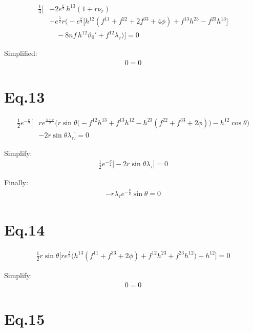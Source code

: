 \documentclass[12pt]{article}
\begin{document}
\begin{align*}
\frac{1}{4} \Big[
 & -2 e^{\frac{\nu}{2}} \, h^{13} \left( 1 + r \nu_r \right) \\
 & + e^{\frac{\lambda}{2}} r \Big(
   - e^{\frac{\nu}{2}} \big[
       h^{12}(f^{11} + f^{22} + 2f^{33} + 4\phi)
       + f^{13} h^{23}
       - f^{23} h^{13}
     \big] \\
   & \quad - 8 nf \, h^{12} \vartheta_0'
   + f^{12}\lambda_\tau
 \Big)
\Big] = 0
\end{align*}

Simplified:
\begin{align*}
  0 = 0
\end{align*}

\section*{Eq.13}

\begin{align*}
\frac{1}{2} e^{-\frac{\nu}{2}} \Big[
  & r e^{\frac{\lambda + \nu}{2}} 
  \Big(
    r \sin\theta \big(
      -f^{12}h^{13}
      + f^{13}h^{12}
      - h^{23}(f^{22} + f^{33} + 2\phi)
    \big)
    - h^{12}\cos\theta
  \Big) \\
  & - 2r \sin\theta \lambda_\tau
\Big] = 0
\end{align*}

Simplify:
\begin{align*}
\frac{1}{2} e^{-\frac{\nu}{2}} \Big[ - 2r \sin\theta \lambda_\tau \Big] = 0
\end{align*}

Finally:
\begin{align*}
- r \lambda_\tau e^{-\frac{\nu}{2}}\sin\theta = 0
\end{align*}

\section*{Eq.14}

\begin{align*}
\frac{1}{2} r \sin\theta \Big[
  r e^{\frac{\lambda}{2}}
  \big(
    h^{13}(f^{11} + f^{33} + 2\phi)
    + f^{12}h^{23}
    + f^{23}h^{12}
  \big)
  + h^{12}
\Big] = 0
\end{align*}

Simplify:
\begin{align*}
  0 = 0
\end{align*}

\section*{Eq.15}
\end{document}
